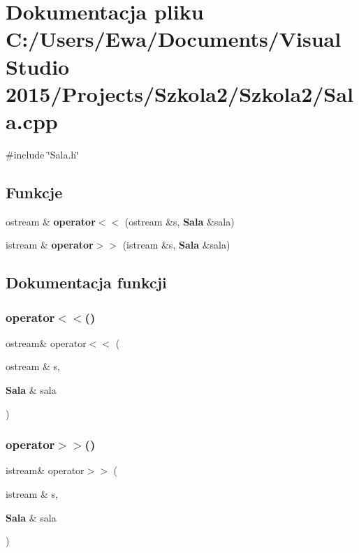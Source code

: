 \section{Dokumentacja pliku C\+:/\+Users/\+Ewa/\+Documents/\+Visual Studio 2015/\+Projects/\+Szkola2/\+Szkola2/\+Sala.cpp}
\label{_sala_8cpp}
{\ttfamily \#include \char`\"{}Sala.\+h\char`\"{}}\newline
\subsection*{Funkcje}
\begin{DoxyCompactItemize}
\item 
ostream \& \textbf{ operator$<$$<$} (ostream \&s, \textbf{ Sala} \&sala)
\item 
istream \& \textbf{ operator$>$$>$} (istream \&s, \textbf{ Sala} \&sala)
\end{DoxyCompactItemize}


\subsection{Dokumentacja funkcji}
\mbox{\label{_sala_8cpp_a6469c863bb72e329da749ac256867a2f}} 
\subsubsection{operator$<$$<$()}
{\footnotesize\ttfamily ostream\& operator$<$$<$ (\begin{DoxyParamCaption}\item[{ostream \&}]{s,  }\item[{\textbf{ Sala} \&}]{sala }\end{DoxyParamCaption})}

\mbox{\label{_sala_8cpp_a123daa1cada89ad7a38d48ae4f882c91}} 
\subsubsection{operator$>$$>$()}
{\footnotesize\ttfamily istream\& operator$>$$>$ (\begin{DoxyParamCaption}\item[{istream \&}]{s,  }\item[{\textbf{ Sala} \&}]{sala }\end{DoxyParamCaption})}

